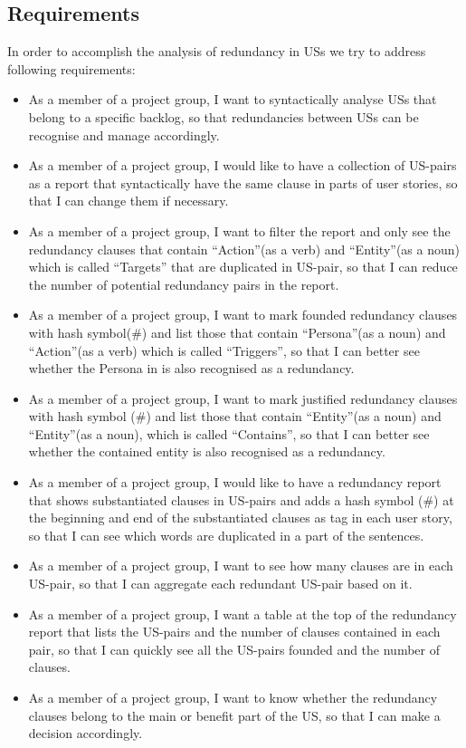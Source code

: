 \subsection{Requirements}\label{redundancy_requirement}
In order to accomplish the analysis of redundancy in USs we try to address following requirements:
\begin{itemize}
\item As a member of a project group, I want to syntactically analyse USs that belong to a specific backlog, so that redundancies between USs can be recognise and manage accordingly.
\item As a member of a project group, I would like to have a collection of US-pairs as a report that syntactically have the same clause in parts of user stories, so that I can change them if necessary.
\item As a member of a project group, I want to filter the report and only see the redundancy clauses that contain \enquote{Action}(as a verb) and \enquote{Entity}(as a noun) which is called \enquote{Targets} that are duplicated in US-pair, so that I can reduce the number of potential redundancy pairs in the report.
\item As a member of a project group, I want to mark founded redundancy clauses with hash symbol(\#) and list those that contain \enquote{Persona}(as a noun) and \enquote{Action}(as a verb) which is called \enquote{Triggers}, so that I can better see whether the Persona in is also recognised as a redundancy.
\item As a member of a project group, I want to mark justified redundancy clauses with hash symbol (\#) and list those that contain \enquote{Entity}(as a noun) and \enquote{Entity}(as a noun), which is called \enquote{Contains}, so that I can better see whether the contained entity is also recognised as a redundancy.
\item As a member of a project group, I would like to have a redundancy report that shows substantiated clauses in US-pairs and adds a hash symbol (\#) at the beginning and end of the substantiated clauses as tag in each user story, so that I can see which words are duplicated in a part of the sentences.
\item As a member of a project group, I want to see how many clauses are in each US-pair, so that I can aggregate each redundant US-pair based on it.
\item As a member of a project group, I want a table at the top of the redundancy report that lists the US-pairs and the number of clauses contained in each pair, so that I can quickly see all the US-pairs founded and the number of clauses. 
\item As a member of a project group, I want to know whether the redundancy clauses belong to the main or benefit part of the US, so that I can make a decision accordingly.

\end{itemize}

